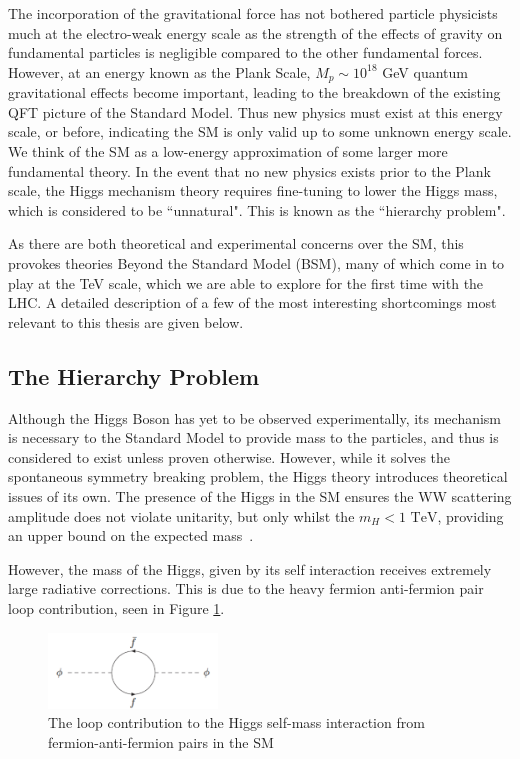 The incorporation of the gravitational force has not bothered particle physicists much at the electro-weak energy scale as the strength of the effects of gravity on fundamental particles is negligible compared to the other fundamental forces. However, at an energy known as the Plank Scale, $M_{p} \sim 10^{18}$ GeV quantum gravitational effects become important, leading to the breakdown of the existing QFT picture of the Standard Model. Thus new physics must exist at this energy scale, or before, indicating the SM is only valid up to some unknown energy scale. We think of the SM as a low-energy approximation of some larger more fundamental theory. In the event that no new physics exists prior to the Plank scale, the Higgs mechanism theory requires fine-tuning to lower the Higgs mass, which is considered to be ``unnatural". This is known as the ``hierarchy problem".

As there are both theoretical and experimental concerns over the SM, this provokes theories Beyond the Standard Model (BSM), many of which come in to play at the TeV scale, which we are able to explore for the first time with the LHC. A detailed description of a few of the most interesting shortcomings most relevant to this thesis are given below.

\subsection{The Hierarchy Problem}
Although the Higgs Boson has yet to be observed experimentally, its mechanism is necessary to the Standard Model to provide mass to the particles, and thus is considered to exist unless proven otherwise. However, while it solves the spontaneous symmetry breaking problem, the Higgs theory introduces theoretical issues of its own. The presence of the Higgs in the SM ensures the WW scattering amplitude does not violate unitarity, but only whilst the $m_{H} < 1$ $\textrm{TeV}$, providing an upper bound on the expected mass~\cite{WWHMass}. 

However, the mass of the Higgs, given by its self interaction receives extremely large radiative corrections. This is due to the heavy fermion anti-fermion pair loop contribution, seen in Figure \ref{fig:hiloop}. 

\begin{figure}
\centering
\includegraphics[width=0.4\textwidth]{Figures/Theory/higgsself}
\caption{\label{fig:hiloop}The loop contribution to the Higgs self-mass interaction from fermion-anti-fermion pairs in the SM}
\end{figure}

